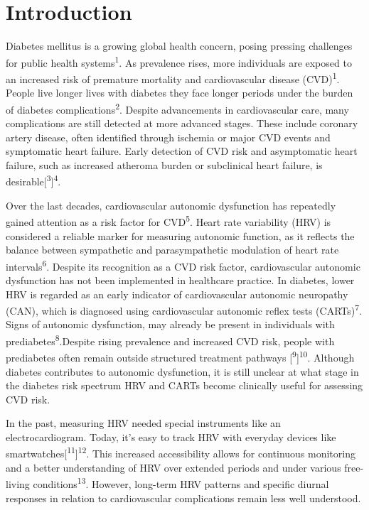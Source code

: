 \documentclass[
  a4paper,
  headsepline=true,
  open=any]{scrbook}
\begin{document}

\hypertarget{introduction}{%
\chapter{Introduction}\label{introduction}}

Diabetes mellitus is a growing global health concern, posing pressing
challenges for public health systems\textsuperscript{1}. As prevalence
rises, more individuals are exposed to an increased risk of premature
mortality and cardiovascular disease (CVD)\textsuperscript{1}. People
live longer lives with diabetes they face longer periods under the
burden of diabetes complications\textsuperscript{2}. Despite
advancements in cardiovascular care, many complications are still
detected at more advanced stages. These include coronary artery disease,
often identified through ischemia or major CVD events and symptomatic
heart failure. Early detection of CVD risk and asymptomatic heart
failure, such as increased atheroma burden or subclinical heart failure,
is desirable{[}\textsuperscript{3}{]}\textsuperscript{4}.

Over the last decades, cardiovascular autonomic dysfunction has
repeatedly gained attention as a risk factor for CVD\textsuperscript{5}.
Heart rate variability (HRV) is considered a reliable marker for
measuring autonomic function, as it reflects the balance between
sympathetic and parasympathetic modulation of heart rate
intervals\textsuperscript{6}. Despite its recognition as a CVD risk
factor, cardiovascular autonomic dysfunction has not been implemented in
healthcare practice. In diabetes, lower HRV is regarded as an early
indicator of cardiovascular autonomic neuropathy (CAN), which is
diagnosed using cardiovascular autonomic reflex tests
(CARTs)\textsuperscript{7}. Signs of autonomic dysfunction, may already
be present in individuals with prediabetes\textsuperscript{8}.Despite
rising prevalence and increased CVD risk, people with prediabetes often
remain outside structured treatment pathways
{[}\textsuperscript{9}{]}\textsuperscript{10}. Although diabetes
contributes to autonomic dysfunction, it is still unclear at what stage
in the diabetes risk spectrum HRV and CARTs become clinically useful for
assessing CVD risk.

In the past, measuring HRV needed special instruments like an
electrocardiogram. Today, it's easy to track HRV with everyday devices
like smartwatches{[}\textsuperscript{11}{]}\textsuperscript{12}. This
increased accessibility allows for continuous monitoring and a better
understanding of HRV over extended periods and under various free-living
conditions\textsuperscript{13}. However, long-term HRV patterns and
specific diurnal responses in relation to cardiovascular complications
remain less well understood.
\end{document}
